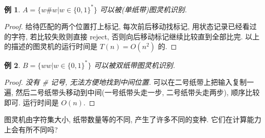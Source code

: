 \documentclass[8pt]{article}
\theoremstyle{compact}
\newtheorem{example}{例}
\begin{document}
\begin{example}
	$A = \{w \# w | w \in \{0, 1\}^*\}$ 可以被(单纸带)图灵机识别.
\end{example}
\begin{proof}
	给待匹配的两个位置打上标记, 每次前后移动找标记, 用状态记录已经看过的字符, 若比较失败则直接 reject, 否则向后移动标记继续比较直到全部比完. 以上的描述的图灵机的运行时间是 $T(n) = O(n^2)$ 的.
\end{proof}
\begin{example}
	$B = \{ww | w \in \{0, 1\}^*\}$ 可以被双纸带图灵机识别.
\end{example}
\begin{proof}
	\textit{没有 \# 记号, 无法方便地找到中间位置.} 可以在二号纸带上把输入复制一遍, 然后二号纸带头移动到中间(一号纸带头走一步, 二号纸带头走两步), 顺序比较即可. 运行时间是 $O(n)$.
\end{proof}

图灵机由字符集大小, 纸带数量等的不同, 产生了许多不同的变种. 它们在计算能力上会有所不同吗?
\end{document}
